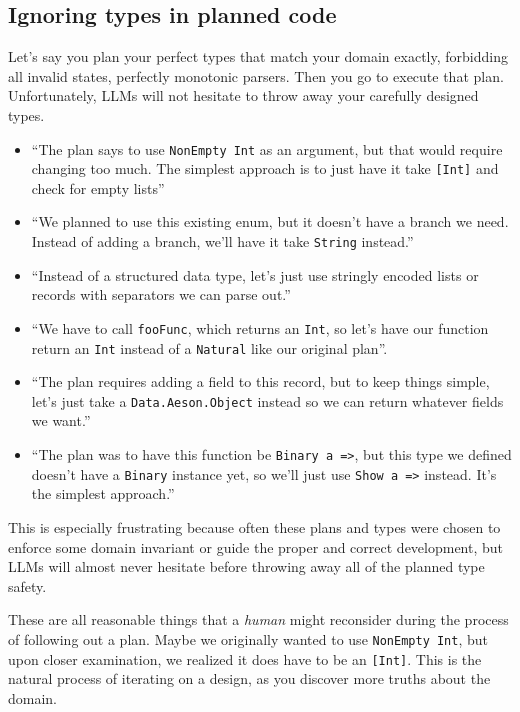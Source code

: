 \documentclass[]{article}
\begin{document}
\subsection{Ignoring types in planned
code}\label{ignoring-types-in-planned-code}

Let's say you plan your perfect types that match your domain exactly, forbidding
all invalid states, perfectly monotonic parsers. Then you go to execute that
plan. Unfortunately, LLMs will not hesitate to throw away your carefully
designed types.

\begin{itemize}
\tightlist
\item
  {``The plan says to use \texttt{NonEmpty\ Int} as an argument, but that would
  require changing too much. The simplest approach is to just have it take
  \texttt{{[}Int{]}} and check for empty lists''}
\item
  {``We planned to use this existing enum, but it doesn't have a branch we need.
  Instead of adding a branch, we'll have it take \texttt{String} instead.''}
\item
  {``Instead of a structured data type, let's just use stringly encoded lists or
  records with separators we can parse out.''}
\item
  {``We have to call \texttt{fooFunc}, which returns an \texttt{Int}, so let's
  have our function return an \texttt{Int} instead of a \texttt{Natural} like
  our original plan''.}
\item
  {``The plan requires adding a field to this record, but to keep things simple,
  let's just take a \texttt{Data.Aeson.Object} instead so we can return whatever
  fields we want.''}
\item
  {``The plan was to have this function be \texttt{Binary\ a\ =\textgreater{}},
  but this type we defined doesn't have a \texttt{Binary} instance yet, so we'll
  just use \texttt{Show\ a\ =\textgreater{}} instead. It's the simplest
  approach.''}
\end{itemize}

This is especially frustrating because often these plans and types were chosen
to enforce some domain invariant or guide the proper and correct development,
but LLMs will almost never hesitate before throwing away all of the planned type
safety.

These are all reasonable things that a \emph{human} might reconsider during the
process of following out a plan. Maybe we originally wanted to use
\texttt{NonEmpty\ Int}, but upon closer examination, we realized it does have to
be an \texttt{{[}Int{]}}. This is the natural process of iterating on a design,
as you discover more truths about the domain.
\end{document}
